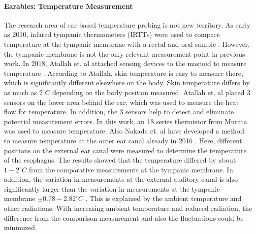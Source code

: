 \paragraph{Earables: Temperature Measurement}
The research area of ear based temperature probing is not new territory.
As early as 2010, infared tympanic thermometers (IRTTs) were used to compare temperature at the tympanic membrane with a rectal and oral sample \cite{Bagley et al. (2011), Basak et al. (2013), Bhangu and Parmar (2010), Fogt et al. (2017), Harmanci et al. (2018), Kallmünzer et al. (2011), Muth et al. (2010), Morán-Navarro et al. (2019), Lee et al. (2011), Keene et al. (2015)}.
However, the tympanic membrane is not the only relevant measurement point in previous work. 
In 2018, Atallah et. al attached sensing devices to the mastoid to measure temperature \cite{atallahErgonomicWearableCore2018}. 
According to Atallah, skin temperature is easy to measure there, which is significantly different elsewhere on the body. 
Skin temperature differs by as much as $2 ^\circ C$ depending on the body position measured.
Atallah et. al placed 3 sensors on the lower area behind the ear, which was used to measure the heat flow for temperature.
In addition, the 3 sensors help to detect and eliminate potential measurement errors.
In this work, an 18 series thermistor from Murata was used to measure temperature.
Also Nakada et. al have developed a method to measure temperature at the outer ear canal already in 2016 \cite{nakadaDevelopmentMethodEstimating2017a}.
Here, different positions on the external ear canal were measured to determine the temperature of the esophagus. 
The results showed that the temperature differed by about $ 1-2 ^\circ C$ from the comparative measurements at the tympanic membrane.
In addition, the variation in measurements at the external auditory canal is also significantly larger than the variation in measurements at the tympanic membrane $ \pm 0.78-2.82 ^\circ C$ \cite{nakadaDevelopmentMethodEstimating2017a}.
This is explained by the ambient temperature and other radiations.
With increasing ambient temperature and reduced radiation, the difference from the comparison measurement and also the fluctuations could be minimized.


